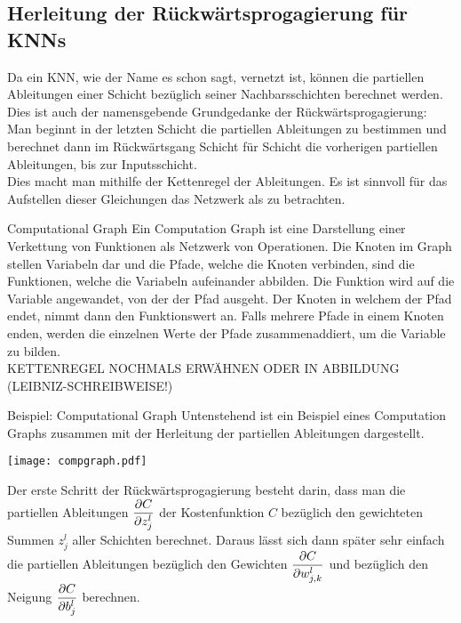 \begin{appendices}
\chapter{Herleitung der Rückwärtsprogagierung für KNNs}\label{sec:anhang_bp}
Da ein KNN, wie der Name es schon sagt, vernetzt ist, können die partiellen
Ableitungen einer Schicht bezüglich seiner Nachbarsschichten berechnet werden.
Dies ist auch der namensgebende Grundgedanke der Rückwärtsprogagierung: Man
beginnt in der letzten Schicht die partiellen Ableitungen zu bestimmen und
berechnet dann im Rückwärtsgang Schicht für Schicht die vorherigen
partiellen Ableitungen, bis zur Inputsschicht. \\
Dies macht man mithilfe der Kettenregel der Ableitungen.
Es ist sinnvoll für das Aufstellen dieser Gleichungen das Netzwerk als
 zu betrachten.
\para{}
\begin{infobox}{Computational Graph}
  Ein Computation Graph ist eine Darstellung einer Verkettung von Funktionen als Netzwerk von Operationen.
  Die Knoten im Graph stellen Variabeln dar und die Pfade, welche die Knoten
  verbinden, sind die Funktionen, welche die Variabeln aufeinander abbilden. Die
  Funktion wird auf die Variable angewandet, von der der Pfad ausgeht. Der Knoten
  in welchem der Pfad endet, nimmt dann den Funktionswert an. Falls
  mehrere Pfade in einem Knoten enden, werden die einzelnen Werte der Pfade
  zusammenaddiert, um die Variable zu bilden. \\
  KETTENREGEL NOCHMALS ERWÄHNEN ODER
  IN ABBILDUNG (LEIBNIZ-SCHREIBWEISE!)
\end{infobox}
\para{}
\begin{examplebox}{Beispiel: Computational Graph}
  Untenstehend ist ein Beispiel eines Computation
  Graphs zusammen mit der Herleitung der partiellen Ableitungen dargestellt.
  \para{}
  \begin{center}
    \texttt{[image: compgraph.pdf]}
  \end{center}
\end{examplebox}
\para{}
Der erste Schritt der Rückwärtsprogagierung besteht darin, dass man die partiellen Ableitungen $\displaystyle\frac{\partial C}{\partial z_j^l}$
der Kostenfunktion $C$ bezüglich den gewichteten Summen $z_j^l$ aller Schichten
berechnet. Daraus lässt sich dann später sehr einfach die partiellen Ableitungen
bezüglich den Gewichten $\displaystyle\frac{\partial C}{\partial w_{j,k}^l}$ und bezüglich den Neigung
$\displaystyle\frac{\partial C}{\partial b_j^l}$ berechnen.

\end{appendices}
